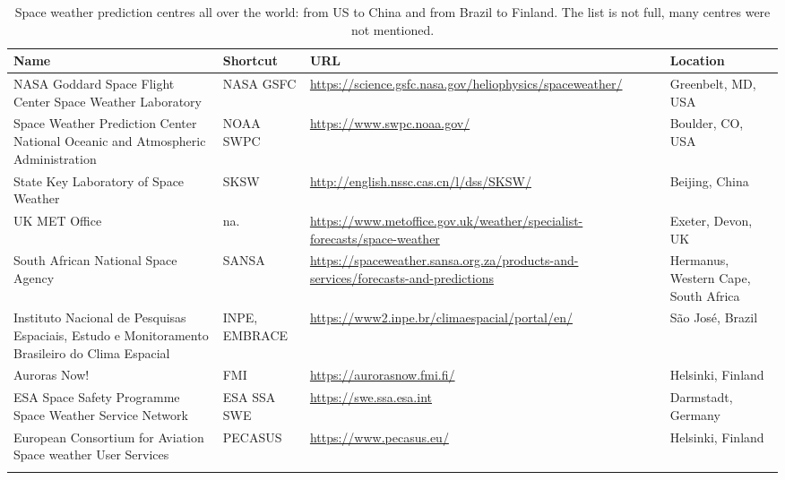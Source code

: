 \documentclass[sn-aps]{sn-jnl}%
\begin{document}
\pagebreak

\begin{table}[h]
\centering
\begin{tabular}[c]{p{3cm}p{1.2cm}p{3.25cm}p{1.75cm}}
Name & Shortcut & URL & Location \\                    
\hline
\hline 
NASA Goddard Space Flight Center Space Weather Laboratory & NASA GSFC & \url{https://science.gsfc.nasa.gov/heliophysics/spaceweather/} & Greenbelt, MD, USA \\
\hline
Space Weather Prediction Center National Oceanic and Atmospheric Administration & NOAA SWPC & \url{https://www.swpc.noaa.gov/} & Boulder, CO, USA\\
\hline
State Key Laboratory of Space Weather & SKSW & \url{http://english.nssc.cas.cn/l/dss/SKSW/} & Beijing, China\\
\hline
UK MET Office & na. & \url{https://www.metoffice.gov.uk/weather/specialist-forecasts/space-weather} & Exeter, Devon, UK\\
\hline
South African National Space Agency & SANSA & \url{https://spaceweather.sansa.org.za/products-and-services/forecasts-and-predictions} & Hermanus, Western Cape, South Africa \\
\hline
Instituto Nacional de Pesquisas Espaciais, Estudo e Monitoramento Brasileiro do Clima Espacial & INPE, EMBRACE & \url{https://www2.inpe.br/climaespacial/portal/en/} & S{\~a}o Jos{\'e}, Brazil \\  
\hline  
Auroras Now! & FMI & \url{https://aurorasnow.fmi.fi/} & Helsinki, Finland\\
\hline 
ESA Space Safety Programme Space Weather Service Network & ESA SSA SWE & \url{https://swe.ssa.esa.int} & Darmstadt, Germany\\
\hline
European Consortium for Aviation Space weather User Services & PECASUS & \url{https://www.pecasus.eu/} & Helsinki, Finland \\ \\
\end{tabular}
\caption[Forecast organisations.]{Space weather prediction centres all over the world: from US to China and from Brazil to Finland. The list is not full, many centres were not mentioned.}
\label{tab:agencies}
\end{table}

\pagebreak
\end{document}
